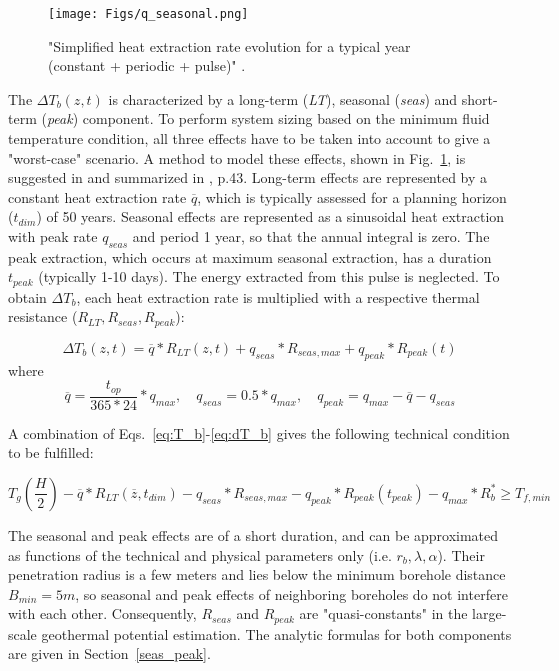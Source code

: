 \begin{figure}
    \centering
    \texttt{[image: Figs/q\_seasonal.png]}
    \caption{"Simplified heat extraction rate evolution for a typical year (constant + periodic + pulse)" \citep{pahud_geothermal_2002}.}
    \label{fig:q_seasonal}
\end{figure}

The $\Delta T_b(z, t)$ is characterized by a long-term (\textit{LT}), seasonal (\textit{seas}) and short-term (\textit{peak}) component. To perform system sizing based on the minimum fluid temperature condition, all three effects have to be taken into account to give a "worst-case" scenario. A method to model these effects, shown in Fig.~\ref{fig:q_seasonal}, is suggested in \citep{claesson_conductive_1988} and summarized in \citep{pahud_geothermal_2002}, p.43. Long-term effects are represented by a constant heat extraction rate $\overline{q}$, which is typically assessed for a planning horizon ($t_{dim}$) of 50 years. Seasonal effects are represented as a sinusoidal heat extraction with peak rate $q_{seas}$ and period 1 year, so that the annual integral is zero. The peak extraction, which occurs at maximum seasonal extraction, has a duration $t_{peak}$ (typically 1-10 days). The energy extracted from this pulse is neglected. To obtain $\Delta T_b$, each heat extraction rate is multiplied with a respective thermal resistance ($R_{LT},R_{seas},R_{peak}$):

\begin{equation}
\label{eq:dT_b}
    \textstyle \Delta T_b(z, t) = \overline{q} * R_{LT}(z, t) + q_{seas} * R_{seas, max} + q_{peak} * R_{peak}(t)
\end{equation}
where
\begin{equation*}
    \overline{q} = \frac{t_{op}}{365*24} * q_{max}, \quad q_{seas} = 0.5 * q_{max}, \quad q_{peak} = q_{max} - \overline{q} - q_{seas}
\end{equation*}

A combination of Eqs.~\ref{eq:T_b}-\ref{eq:dT_b} gives the following technical condition to be fulfilled:

\begin{equation}
    \textstyle T_g(\frac{H}{2}) - \overline{q} * R_{LT}(\overline{z}, t_{dim}) - q_{seas} * R_{seas, max} - q_{peak} * R_{peak}(t_{peak}) - q_{max}*R_b^* \geq T_{f, min}
\end{equation}

The seasonal and peak effects are of a short duration, and can be approximated as functions of the technical and physical parameters only (i.e. $r_b, \lambda, \alpha$). Their penetration radius is a few meters and lies below the minimum borehole distance $B_{min} = 5m$, so seasonal and peak effects of neighboring boreholes do not interfere with each other. Consequently, $R_{seas}$ and $R_{peak}$ are "quasi-constants" in the large-scale geothermal potential estimation. The analytic formulas for both components are given in Section~\ref{seas_peak}. 

